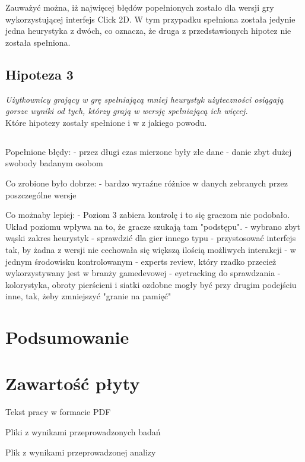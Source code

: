 \documentclass[a4paper,12pt,numbers=noenddot]{report}
\begin{document}
Zauważyć można, iż najwięcej błędów popełnionych zostało dla wersji gry wykorzystującej interfejs Click 2D. W tym przypadku spełniona została jedynie jedna heurystyka z dwóch, co oznacza, że druga z przedstawionych hipotez nie została spełniona.



\section{Hipoteza 3}
\textit{Użytkownicy grający w grę spełniającą mniej heurystyk użyteczności osiągają gorsze wyniki od tych, którzy grają w wersję spełniającą ich więcej.}\\

Które hipotezy zostały spełnione i w z jakiego powodu.


\section{}
Popełnione błędy: 
- przez długi czas mierzone były złe dane
- danie zbyt dużej swobody badanym osobom

Co zrobione było dobrze:
- bardzo  wyraźne różnice w danych zebranych przez poszczególne wersje

Co możnaby lepiej:
- Poziom 3 zabiera kontrolę i to się graczom nie podobało. Układ poziomu wpływa na to, że gracze szukają tam "podstępu".
- wybrano zbyt wąski zakres heurystyk
- sprawdzić dla gier innego typu
- przystosować interfejs tak, by żadna z wersji nie cechowała się większą ilością możliwych interakcji
- w jednym środowisku kontrolowanym
- experts review, który rzadko przecież wykorzystywany jest w branży gamedevowej
- eyetracking do sprawdzania
- kolorystyka, obroty pierścieni i siatki ozdobne mogły być przy drugim podejściu inne, tak, żeby zmniejszyć "granie na pamięć"

\chapter{Podsumowanie}

 

\renewcommand{\listoffigures}{\begingroup
\tocchapter
{}
\endgroup}
\listoffigures
\chapter{Zawartość płyty}
\begin{enumerate}[label={[\arabic*]}]
  \item Tekst pracy w formacie PDF
  \item Pliki z wynikami przeprowadzonych badań
  \item Plik z wynikami przeprowadzonej analizy
\end{enumerate}
\end{document}

